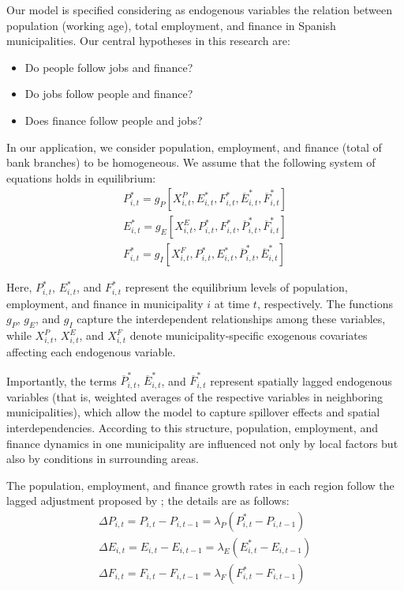 \documentclass[a4paper,11pt,oneside]{article}
\begin{document}
Our model is specified considering as endogenous variables the relation between population (working age), total employment, and finance in Spanish municipalities. Our central hypotheses in this research are:
%
\begin{itemize}
\item Do people follow jobs and finance?
\item Do jobs follow people and finance?
\item Does finance follow people and jobs?
\end{itemize}



In our application, we consider population, employment, and finance (total of bank branches) to be homogeneous. We assume that the following system of equations holds in equilibrium:
%
\begin{equation*}
\begin{array}{l}
P^*_{i,t} = g_P[X_{i,t}^P, E^{*}_{i,t}, F^{*}_{i,t}, \overline{E}_{i,t}^*, \overline{F}_{i,t}^*] \\
E^{*}_{i,t} = g_E[X_{i,t}^E, P^{*}_{i,t}, F^{*}_{i,t}, \overline{P}_{i,t}^*, \overline{F}_{i,t}^*] \\
F^{*}_{i,t} = g_I[X_{i,t}^F, P^{*}_{i,t}, E^{*}_{i,t}, \overline{P}_{i,t}^*, \overline{E}_{i,t}^*]
\end{array}
\end{equation*}


Here, \(P^*_{i,t}\), \(E^*_{i,t}\), and \(F^*_{i,t}\) represent the equilibrium levels of population, employment, and finance in municipality \(i\) at time \(t\), respectively. The functions \(g_P\), \(g_E\), and \(g_I\) capture the interdependent relationships among these variables, while \(X_{i,t}^P\), \(X_{i,t}^E\), and \(X_{i,t}^F\) denote municipality-specific exogenous covariates affecting each endogenous variable.

Importantly, the terms \(\overline{P}_{i,t}^*\), \(\overline{E}_{i,t}^*\), and \(\overline{F}_{i,t}^*\) represent spatially lagged endogenous variables (that is, weighted averages of the respective variables in neighboring municipalities), which allow the model to capture spillover effects and spatial interdependencies. According to this structure, population, employment, and finance dynamics in one municipality are influenced not only by local factors but also by conditions in surrounding areas.



The population, employment, and finance growth rates in each region follow the lagged adjustment proposed by \cite{carlino1987determinants}; the details are as follows:
%
\begin{equation}
\tag{ii}
\label{eq:equation_4}
\begin{array}{l}
\Delta P_{i,t} = P_{i,t} - P_{i,t-1} = \lambda_{P}(P^{*}_{i,t} - P_{i,t-1}) \\
\Delta E_{i,t} = E_{i,t} - E_{i,t-1} = \lambda_{E}(E^{*}_{i,t} - E_{i,t-1}) \\
\Delta F_{i,t} = F_{i,t} - F_{i,t-1} = \lambda_{F}(F^{*}_{i,t} - F_{i,t-1})
\end{array}
\end{equation}
\end{document}
